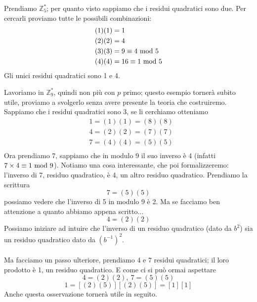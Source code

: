 \begin{esempio}
	Prendiamo $\mathbb{Z}_5^*$; per quanto visto sappiamo che i residui quadratici sono due. Per cercarli proviamo tutte le possibili combinazioni:
	\begin{align*}
	&(1)(1)=1\\
	&(2)(2)=4\\
	&(3)(3)=9\equiv4\ \mathrm{mod}\ 5\\
	&(4)(4)=16\equiv1\ \mathrm{mod}\ 5
	\end{align*}
	Gli unici residui quadratici sono 1 e 4.
\end{esempio}
\begin{esempio}
	\label{residuo_not_primo}
	Lavoriamo in $\mathbb{Z}_9^*$, quindi non più con $p$ primo; questo esempio tornerà subito utile, proviamo a svolgerlo senza avere presente la teoria che costruiremo. Sappiamo che i residui quadratici sono 3, se li cerchiamo otteniamo 
	\begin{align*}
	&1=(1)(1)=(8)(8)\\
	&4=(2)(2)=(7)(7)\\
	&7=(4)(4)=(5)(5)\\
	\end{align*}
	Ora prendiamo 7, sappiamo che in modulo 9 il suo inverso è 4 (infatti $7\times4\equiv1\ \mathrm{mod}\ 9$). Notiamo una cosa interessante, che poi formalizzeremo: l'inverso di 7, residuo quadratico, è 4, un altro residuo quadratico. Prendiamo la scrittura 
	\begin{equation*}
	7=(5)(5)
	\end{equation*}
	possiamo vedere che l'inverso di 5 in modulo 9 è 2. Ma se facciamo ben attenzione a quanto abbiamo appena scritto$\dots$
	\begin{equation*}
	4=(2)(2)
	\end{equation*}
	Possiamo iniziare ad intuire che l'inverso di un residuo quadratico (dato da $b^2$) sia un residuo quadratico dato da $\left(b^{-1}\right)^2$. \\ \\ Ma facciamo un passo ulteriore, prendiamo $4$ e $7$ residui quadratici; il loro prodotto è 1, un residuo quadratico. E come ci si può ormai aspettare 
	\begin{equation*}
	4=(2)(2), \ 7=(5)(5)
	\end{equation*}
	\begin{equation*}
	1=[(2)(5)][(2)(5)]=[1][1]
	\end{equation*}
	Anche questa osservazione tornerà utile in seguito.
\end{esempio}
